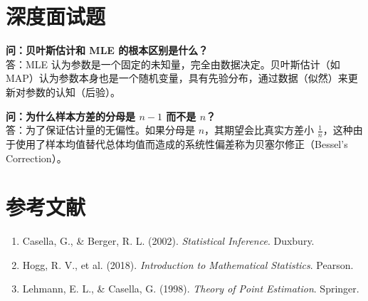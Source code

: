 \documentclass[12pt, a4paper]{article}
\begin{document}
\section{深度面试题}

\textbf{问：贝叶斯估计和 MLE 的根本区别是什么？}\\
答：MLE 认为参数是一个固定的未知量，完全由数据决定。贝叶斯估计（如 MAP）认为参数本身也是一个随机变量，具有先验分布，通过数据（似然）来更新对参数的认知（后验）。

\textbf{问：为什么样本方差的分母是 $n-1$ 而不是 $n$？}\\
答：为了保证估计量的无偏性。如果分母是 $n$，其期望会比真实方差小 $\frac{1}{n}$，这种由于使用了样本均值替代总体均值而造成的系统性偏差称为贝塞尔修正（Bessel's Correction）。

\section{参考文献}
\begin{enumerate}
    \item Casella, G., \& Berger, R. L. (2002). \textit{Statistical Inference}. Duxbury.
    \item Hogg, R. V., et al. (2018). \textit{Introduction to Mathematical Statistics}. Pearson.
    \item Lehmann, E. L., \& Casella, G. (1998). \textit{Theory of Point Estimation}. Springer.
\end{enumerate}
\end{document}
